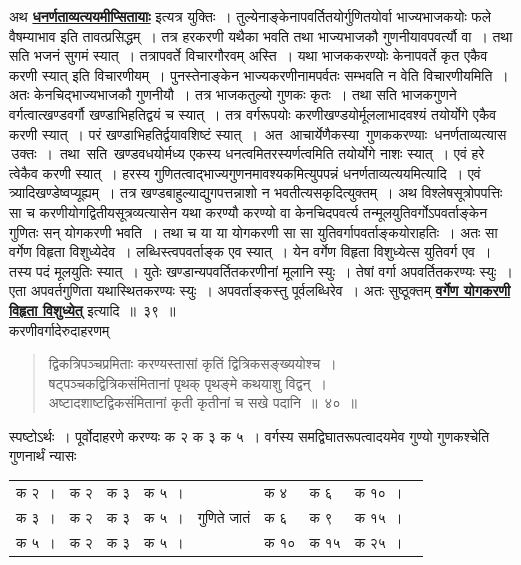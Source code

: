 \documentclass[11pt, openany]{book}
\begin{document}
{{\vspace{-4mm}
 अथ \hyperref[38]{\textbf{धनर्णताव्यत्ययमीप्सितायाः}} इत्यत्र युक्तिः~।
तुल्येनाङ्केनापवर्तितयोर्गुणितयोर्वा भाज्यभाजकयोः फले वैषम्याभाव इति
तावत्प्रसिद्धम्~। तत्र हरकरणी यथैका भवति 
तथा भाज्यभाजकौ गुणनीयावपवर्त्यौ वा~। तथा सति भजनं सुगमं स्यात्~।
तत्रापवर्ते विचारगौरवम् अस्ति~। यथा भाजककरण्योः केनापवर्ते कृत एकैव करणी
स्यात् इति विचारणीयम्~। पुनस्तेनाङ्केन भाज्यकरणीनामपर्वतः सम्भवति न वेति विचारणीयमिति~। अतः केनचिद्भाज्यभाजकौ गुणनीयौ~। तत्र भाजकतुल्यो गुणकः कृतः~। तथा
सति भाजकगुणने वर्गत्वात्खण्डवर्गौ खण्डाभिहतिद्वयं च स्यात्~। तत्र
वर्गरूपयोः करणीखण्डयोर्मूललाभादवश्यं तयोर्योगे एकैव करणी स्यात्~। परं
खण्डाभिहतिर्द्वयावशिष्टं स्यात्~। \,अत \,आचार्येणैकस्या \,गुणककरण्याः \,धनर्णताव्यत्यास \,उक्तः~। \,तथा \,सति \,खण्डवधयोर्मध्य एकस्य धनत्वमितरस्यर्णत्वमिति तयोर्योगे नाशः स्यात्~।
एवं हरे त्वेकैव करणी स्यात्~। हरस्य गुणितत्वाद्भाज्यगुणनमावश्यकमित्युपपन्नं
धनर्णताव्यत्ययमित्यादि~। एवं त्र्यादिखण्डेष्वप्यूह्यम्~। तत्र
खण्डबाहुल्याद्युगपत्तन्नाशो न भवतीत्यसकृदित्युक्तम्~। अथ
विश्लेषसूत्रोपपत्तिः सा च करणीयोगद्वितीयसूत्रव्यत्यासेन यथा 
करण्यौ करण्यो वा केनचिदपवर्त्य तन्मूलयुतिवर्गोऽपवर्ताङ्केन गुणितः सन्
योगकरणी
\newpage
\noindent भवति~। तथा च या या योगकरणी सा सा युतिवर्गापवर्ताङ्कयोराहतिः~। अतः सा 
वर्गेण विहृता विशुध्येदेव~। लब्धिस्त्वपवर्ताङ्क एव स्यात्~। येन वर्गेण विहृता 
विशुध्येत्स युतिवर्ग एव~। तस्य पदं मूलयुतिः स्यात्~। युतेः
खण्डान्यपवर्तितकरणीनां मूलानि स्युः~। तेषां वर्गा अपवर्तितकरण्यः स्युः~। 
एता अपवर्तगुणिता यथास्थितकरण्यः स्युः~। अपवर्ताङ्कस्तु पूर्वलब्धिरेव~। अतः 
सुष्ठूक्तम् \hyperref[39]{\textbf{वर्गेण योगकरणी विहृता विशुध्येत्}} इत्यादि~॥~३९~॥\\

\vspace{-2mm}
{\bqt करणीवर्गादेरुदाहरणम्\textendash}
\begin{quote}
    \eg 
    द्विकत्रिपञ्चप्रमिताः करण्यस्तासां कृतिं द्वित्रिकसङ्ख्ययोश्च~। \\
षट्पञ्चकद्वित्रिकसंमितानां पृथक् पृथङ्मे कथयाशु विद्वन्~। \\
अष्टादशाष्टद्विकसंमितानां कृती कृतीनां च सखे पदानि~॥~४०~॥
\end{quote}

 स्पष्टोऽर्थः~। पूर्वोदाहरणे करण्यः क २ क ३ क ५~। वर्गस्य
समद्विघातरूपत्वादयमेव गुण्यो गुणकश्चेति गुणनार्थं न्यासः\textendash
\vspace{-1mm}

\begin{table}[h!]
    \centering\s
    \begin{tabular}{lllllllll}
        क २~।& क २& क ३& क ५~।& &क ४ &क ६ &क १०~। \\
क ३~।& क २& क ३& क ५~।& गुणिते जातं& क ६ &क ९ &क १५~। \\
क ५~। &क २ &क ३ &क ५~। &&क १०& क १५ &क २५~।
    \end{tabular}
\end{table}

}}
\end{document}
